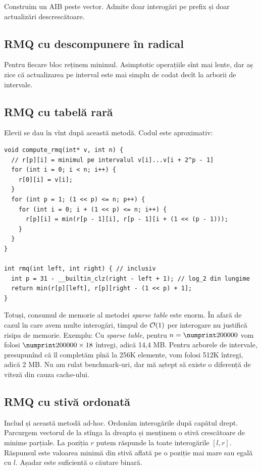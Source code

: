\documentclass[../main.tex]{subfiles}
\begin{document}
Construim un AIB peste vector. Admite doar interogări pe prefix și doar actualizări descrescătoare.

\subsection{RMQ cu descompunere în radical}

Pentru fiecare bloc reținem minimul. Asimptotic operațiile sînt mai lente, dar aș zice că actualizarea pe interval este mai simplu de codat decît la arborii de intervale.

\subsection{RMQ cu tabelă rară}

Elevii se dau în vînt după această metodă. Codul este aproximativ:

\begin{verbatim}
void compute_rmq(int* v, int n) {
  // r[p][i] = minimul pe intervalul v[i]...v[i + 2^p - 1]
  for (int i = 0; i < n; i++) {
    r[0][i] = v[i];
  }
  for (int p = 1; (1 << p) <= n; p++) {
    for (int i = 0; i + (1 << p) <= n; i++) {
      r[p][i] = min(r[p - 1][i], r[p - 1][i + (1 << (p - 1)));
    }
  }
}

int rmq(int left, int right) { // inclusiv
  int p = 31 - __builtin_clz(right - left + 1); // log_2 din lungime
  return min(r[p][left], r[p][right - (1 << p) + 1];
}
\end{verbatim}

Totuși, consumul de memorie al metodei \textit{sparse table} este enorm. În afară de cazul în care avem multe interogări, timpul de $\mathcal{O}(1)$ per interogare nu justifică risipa de memorie. Exemplu: Cu \textit{sparse table}, pentru $n = \np{200000}$ vom folosi $\np{200000} \times 18$ întregi, adică 14,4 MB. Pentru arborele de intervale, presupunînd că îl completăm pînă la 256K elemente, vom folosi 512K întregi, adică 2 MB. Nu am rulat benchmark-uri, dar mă aștept să existe o diferență de viteză din cauza cache-ului.

\subsection{RMQ cu stivă ordonată}

Includ și această metodă ad-hoc. Ordonăm interogările după capătul drept. Parcurgem vectorul de la stînga la dreapta și menținem o stivă crescătoare de minime parțiale. La poziția $r$ putem răspunde la toate interogările $[l, r]$. Răspunsul este valoarea minimă din stivă aflată pe o poziție mai mare sau egală cu $l$. Așadar este suficientă o căutare binară.
\end{document}
